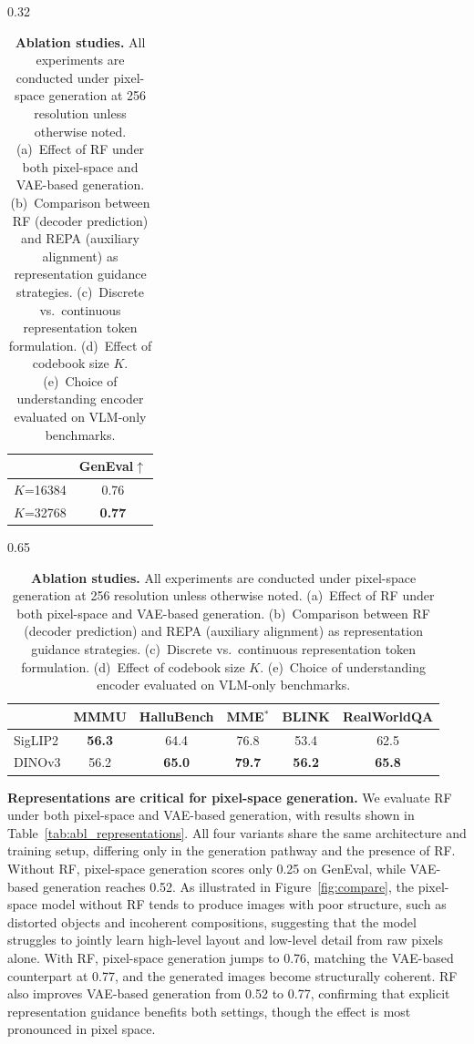 \documentclass{llmxive}
\begin{document}
\begin{table}[t]
\noindent
\begin{subtable}[t]{0.32\textwidth}
\centering
\small
\caption{\textbf{Rep.\ token codebook size.}}
\label{tab:abl_codebook}
\begin{tabular}{lc}
\toprule
 & GenEval$\uparrow$ \\
\midrule
$K$=16384 & 0.76 \\
$K$=32768 & \textbf{0.77} \\
\bottomrule
\end{tabular}
\end{subtable}
\hfill
\begin{subtable}[t]{0.65\textwidth}
\small
\setlength{\tabcolsep}{3pt}
\caption{\textbf{Understanding encoder.}}
\label{tab:abl_encoder}
\begin{tabular}{lccccc}
\toprule
 & MMMU & HalluBench & MME$^*$ & BLINK & RealWorldQA \\
\midrule
SigLIP2 & \textbf{56.3} & 64.4 & 76.8 & 53.4 & 62.5 \\
DINOv3 & 56.2 & \textbf{65.0} & \textbf{79.7} & \textbf{56.2} & \textbf{65.8} \\
\bottomrule
\end{tabular}
\end{subtable}
\caption{\textbf{Ablation studies.} All experiments are conducted under pixel-space generation at 256 resolution unless otherwise noted. (a)~Effect of RF under both pixel-space and VAE-based generation. (b)~Comparison between RF (decoder prediction) and REPA (auxiliary alignment) as representation guidance strategies. (c)~Discrete vs.\ continuous representation token formulation. (d)~Effect of codebook size $K$. (e)~Choice of understanding encoder evaluated on VLM-only benchmarks.}
\label{tab:ablation}
\end{table}




\textbf{Representations are critical for pixel-space generation.}
We evaluate RF under both pixel-space and VAE-based generation, with results shown in Table~\ref{tab:abl_representations}. All four variants share the same architecture and training setup, differing only in the generation pathway and the presence of RF. Without RF, pixel-space generation scores only 0.25 on GenEval, while VAE-based generation reaches 0.52. As illustrated in Figure~\ref{fig:compare}, the pixel-space model without RF tends to produce images with poor structure, such as distorted objects and incoherent compositions, suggesting that the model struggles to jointly learn high-level layout and low-level detail from raw pixels alone. With RF, pixel-space generation jumps to 0.76, matching the VAE-based counterpart at 0.77, and the generated images become structurally coherent. RF also improves VAE-based generation from 0.52 to 0.77, confirming that explicit representation guidance benefits both settings, though the effect is most pronounced in pixel space.
\end{document}
